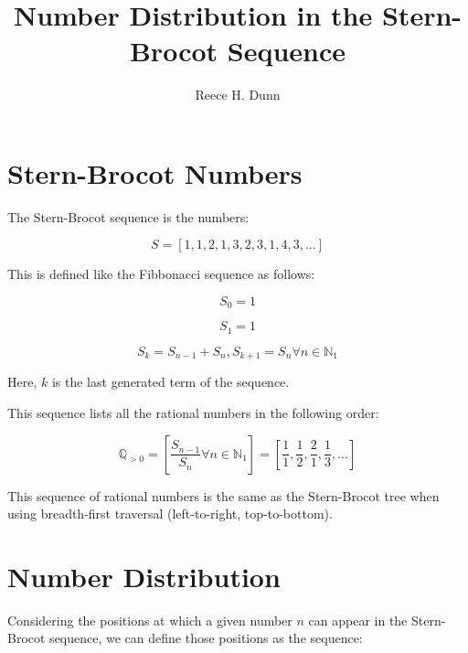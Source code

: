 \documentclass{article}
\title{Number Distribution in the Stern-Brocot Sequence}
\date{}
\author{Reece H. Dunn}
\begin{document}
\maketitle

\section{Stern-Brocot Numbers}

The Stern-Brocot sequence is the numbers:

\begin{displaymath}
S = [1, 1, 2, 1, 3, 2, 3, 1, 4, 3, ...]
\end{displaymath}

\noindent
This is defined like the Fibbonacci sequence as follows:

\begin{displaymath}
S_0 = 1
\end{displaymath}

\begin{displaymath}
S_1 = 1
\end{displaymath}

\begin{displaymath}
S_k = S_{n-1} + S_n, S_{k+1} = S_n \forall n \in \mathbb{N}_1
\end{displaymath}

\noindent
Here, \begin{math}k\end{math} is the last generated term of the sequence.

\noindent
This sequence lists all the rational numbers in the following order:

\begin{displaymath}
\mathbb{Q}_{>0}
=
\left[
\frac{S_{n-1}}{S_n}
\forall n \in \mathbb{N}_{1}
\right]
=
\left[
\frac{1}{1},
\frac{1}{2},
\frac{2}{1},
\frac{1}{3},
...
\right]
\end{displaymath}

\noindent
This sequence of rational numbers is the same as the Stern-Brocot tree when
using breadth-first traversal (left-to-right, top-to-bottom).

\section{Number Distribution}

Considering the positions at which a given number \begin{math}n\end{math} can
appear in the Stern-Brocot sequence, we can define those positions as the
sequence:
\end{document}
